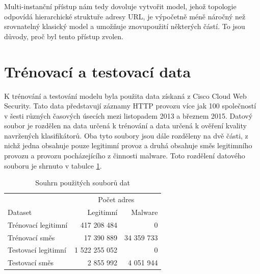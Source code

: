 Multi-instanční přístup nám tedy dovoluje vytvořit model, jehož topologie odpovídá hierarchické struktuře adresy URL, je výpočetně méně náročný než srovnatelný klasický model a umožňuje znovupoužití některých částí. To jsou důvody, proč byl tento přístup zvolen.

\section{Trénovací a testovací data}\label{dataset}
K trénování a testování modelu byla použita data získaná z Cisco Cloud Web Security. Tato data představují záznamy HTTP provozu více jak 100 společností v šesti různých časových úsecích mezi listopadem 2013 a březnem 2015. Datový soubor je rozdělen na data určená k trénování a data určená k ověření kvality navržených klasifikátorů. Oba tyto soubory jsou dále rozděleny na dvě části, z nichž jedna obsahuje pouze legitimní provoz a druhá obsahuje směs legitimního provozu a provozu pocházejícího z činnosti malware. Toto rozdělení datového souboru je shrnuto v tabulce \ref{dataset_table}.

\begin{table}[h]
	\caption{Souhrn použitých souborů dat}\label{dataset_table}
	\centering
	\begin{tabular}{lrr}
		\toprule
		\null & \multicolumn{2}{c}{Počet adres} \\
		\cmidrule(l){2-3}
		Dataset & Legitimní & Malware \\
		\midrule
		Trénovací legitimní & 417 208 484 & 0 \\
		Trénovací směs & 17 390 889 & 34 359 733 \\
		Testovací legitimní & 1 522 255 052 & 0 \\
		Testovací směs & 2 855 992 & 4 051 944 \\
		\bottomrule
	\end{tabular}
\end{table}
